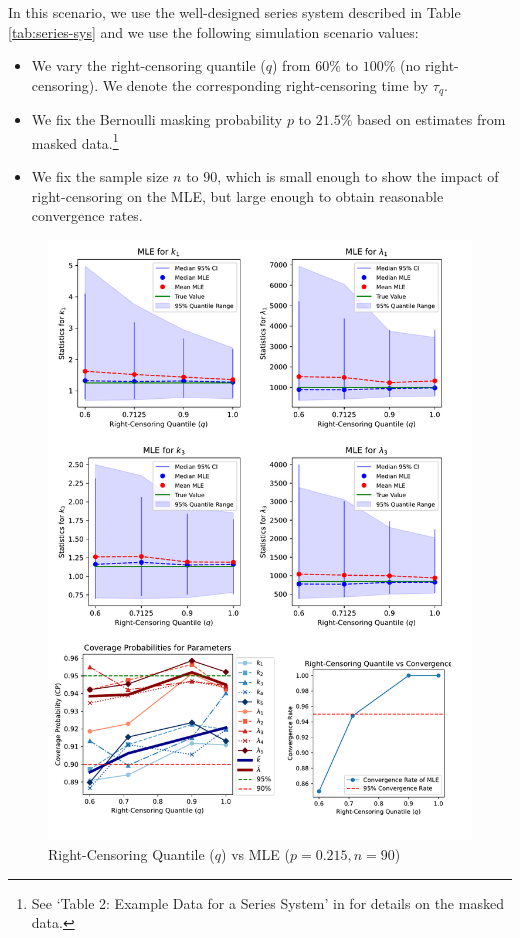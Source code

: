 \documentclass[
]{article}
\providecommand{\tightlist}{%
  \setlength{\itemsep}{0pt}\setlength{\parskip}{0pt}}
\theoremstyle{definition}
\theoremstyle{plain}
\theoremstyle{definition}
\theoremstyle{definition}
\theoremstyle{definition}
\theoremstyle{definition}
\theoremstyle{remark}
\begin{document}
In this scenario, we use the well-designed series system described in Table \ref{tab:series-sys}
and we use the following simulation scenario values:

\begin{itemize}
\tightlist
\item
  We vary the right-censoring quantile (\(q\)) from \(60\%\) to \(100\%\)
  (no right-censoring). We denote the corresponding right-censoring time by \(\tau_q\).
\item
  We fix the Bernoulli masking probability \(p\) to \(21.5\%\) based on estimates from
  masked data.\footnote{See `Table 2: Example Data for a Series System' in \citep{Huairu-2013} for details on the masked data.}
\item
  We fix the sample size \(n\) to \(90\), which is small enough to show the impact of
  right-censoring on the MLE, but large enough to obtain reasonable convergence
  rates.
\end{itemize}

\begin{figure}

{\centering \includegraphics[width=1\linewidth]{image/5_system_tau_fig} 

}

\caption{Right-Censoring Quantile ($q$) vs MLE ($p = 0.215, n = 90$)}\label{fig:q-vs-stats}
\end{figure}
\end{document}
